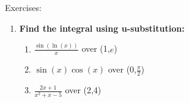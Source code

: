 \documentclass[../revisedmain.tex]{subfiles}
\begin{document}
	\begin{center}
		\LARGE Exercises:
	\end{center}
	\begin{enumerate}
		\item \textbf{Find the integral using u-substitution:}
		\begin{enumerate}
			\item $\frac{\sin(\ln(x))}{x}$ over (1,$e$)
			\item $\sin(x)\cos(x)$ over (0,$\frac{\pi}{2}$)
			\item $\frac{2x+1}{x^2+x-5}$ over (2,4)
		\end{enumerate}
	\end{enumerate}
\end{document}
